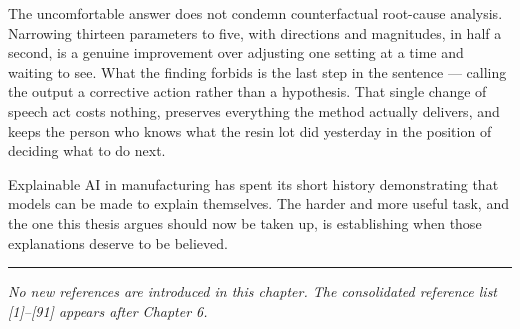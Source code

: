 The uncomfortable answer does not condemn counterfactual root-cause analysis. Narrowing thirteen parameters to five, with directions and magnitudes, in half a second, is a genuine improvement over adjusting one setting at a time and waiting to see. What the finding forbids is the last step in the sentence --- calling the output a corrective action rather than a hypothesis. That single change of speech act costs nothing, preserves everything the method actually delivers, and keeps the person who knows what the resin lot did yesterday in the position of deciding what to do next.

Explainable AI in manufacturing has spent its short history demonstrating that models can be made to explain themselves. The harder and more useful task, and the one this thesis argues should now be taken up, is establishing when those explanations deserve to be believed.

\begin{center}\rule{0.5\linewidth}{0.5pt}\end{center}

\emph{No new references are introduced in this chapter. The consolidated reference list {[}1{]}--{[}91{]} appears after Chapter 6.}
